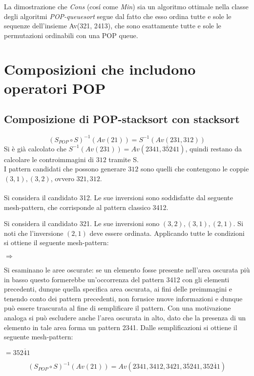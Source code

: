 La dimostrazione che \textit{Cons} (cos\'i come \textit{Min}) sia un algoritmo ottimale nella classe degli algoritmi \textit{POP-queuesort} segue dal fatto che esso ordina tutte e sole le sequenze dell'insieme Av(321, 2413), che sono esattamente tutte e sole le permutazioni ordinabili con una POP queue\cite{cioni2021sorting}.
\section{Composizioni che includono operatori POP}
\subsection{Composizione di {POP-stacksort} con {stacksort}}
$$(S_{POP}\circ{S})^{-1}(Av(21))=S^{-1}(Av(231,312))$$
Si \`e gi\`a calcolato che $S^{-1}(Av(231))=Av(2341, 3\overline{5}241)$, quindi restano da calcolare le controimmagini di $312$ tramite S.\\
I pattern candidati che possono generare $312$ sono quelli che contengono le coppie $(3,1),(3,2)$, ovvero $321, 312$.\\\\
Si considera il candidato 312. Le sue inversioni sono soddisfatte dal seguente mesh-pattern, che corrisponde al pattern classico 3412.
\begin{center}
\end{center}
Si considera il candidato 321. Le sue inversioni sono $(3,2),(3,1),(2,1)$. Si noti che l'inversione $(2,1)$ deve essere ordinata. Applicando tutte le condizioni si ottiene il seguente mesh-pattern:
\begin{center}
$\Rightarrow$
\end{center}
Si esaminano le aree oscurate: se un elemento fosse presente nell'area oscurata pi\`u in basso questo formerebbe un'occorrenza del pattern 3412 con gli elementi precedenti, dunque quella specifica area oscurata, ai fini delle preimmagini e tenendo conto dei pattern precedenti, non fornsice nuove informazioni e dunque pu\`o essere trascurata al fine di semplificare il pattern. Con una motivazione analoga si pu\`o escludere anche l'area oscurata in alto, dato che la presenza di un elemento in tale area forma un pattern 2341. Dalle semplificazioni si ottiene il seguente mesh-pattern:
\begin{center}
 $= 352\overline{4}1$
\end{center}
$$(S_{POP}\circ S)^{-1}(Av(21))=Av(2341, 3412, 3421, 3\overline{5}241, 352\overline{4}1)$$
